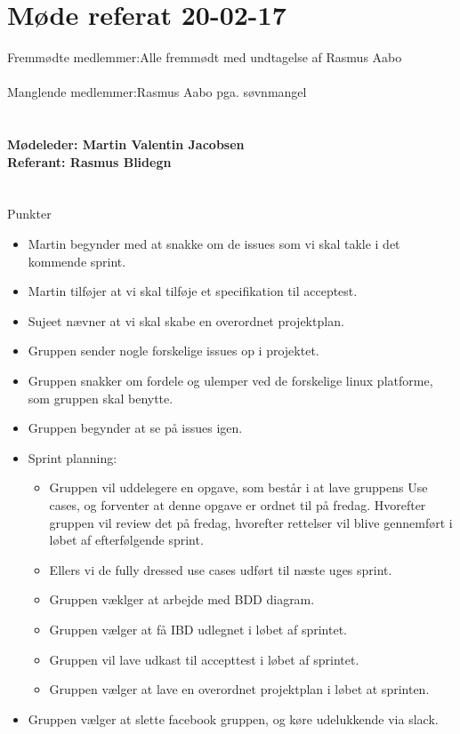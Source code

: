 \documentclass[12pt]{article}
\begin{document}
\section*{Møde referat 20-02-17}

Fremmødte medlemmer:Alle fremmødt med undtagelse af Rasmus Aabo\\\\
Manglende medlemmer:Rasmus Aabo pga. søvnmangel\\\\ 
\\\textbf{Mødeleder: Martin Valentin Jacobsen}
\\\textbf{Referant: Rasmus Blidegn}
\\\\\\
Punkter
\begin{itemize}
\item Martin begynder med at snakke om de issues som vi skal takle i det kommende sprint. 
\item Martin tilføjer at vi skal tilføje et specifikation til acceptest.
\item Sujeet nævner at vi skal skabe en overordnet projektplan.
\item Gruppen sender nogle forskelige issues op i projektet. 
\item Gruppen snakker om fordele og ulemper ved de forskelige linux platforme, som gruppen skal benytte.
\item Gruppen begynder at se på issues igen. 
\item Sprint planning:
\begin{itemize}
\item Gruppen vil uddelegere en opgave, som består i at lave gruppens Use cases, og forventer at denne opgave er ordnet til på fredag. Hvorefter gruppen vil review det på fredag, hvorefter rettelser vil blive gennemført i løbet af efterfølgende sprint.
\item Ellers vi de fully dressed use cases udført til næste uges sprint.
\item Gruppen væklger at arbejde med BDD diagram. 
\item Gruppen vælger at få IBD udlegnet i løbet af sprintet. 
\item Gruppen vil lave udkast til accepttest i løbet af sprintet. 
\item Gruppen vælger at lave en overordnet projektplan i løbet at sprinten. 
\end{itemize}
\item Gruppen vælger at slette facebook gruppen, og køre udelukkende via slack. 

\end{itemize}
\end{document}
